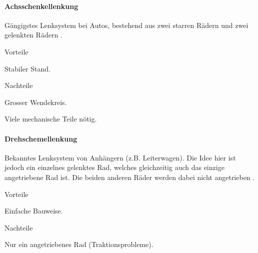 \documentclass[../main.tex]{subfiles}
\begin{document}
\paragraph{Achsschenkellenkung} \label{recherche-achsschenkellenkung}

Gängigstes Lenksystem bei Autos, bestehend aus zwei starren Rädern und zwei gelenkten Rädern \cite{achsschenkel}.

\begin{minipage}[t]{0.48\textwidth}
    \begin{items}
      \item [Vorteile]
      \item Stabiler Stand.
 \end{items}
\end{minipage}
\hfill
\begin{minipage}[t]{0.48\textwidth}
    \begin{items}
      \item [Nachteile]
      \item Grosser Wendekreis.
      \item Viele mechanische Teile nötig.
    \end{items}
\end{minipage}

\paragraph{Drehschemellenkung} \label{recherche-drehschemellenkung}

Bekanntes Lenksystem von Anhängern (z.B. Leiterwagen). Die Idee hier ist jedoch ein einzelnes gelenktes Rad, welches gleichzeitig auch das einzige angetriebene Rad ist. Die beiden anderen Räder werden dabei nicht angetrieben \cite{lenkungsarten}.

\begin{minipage}[t]{0.48\textwidth}
    \begin{items}
      \item [Vorteile]
      \item Einfache Bauweise.
 \end{items}
\end{minipage}
\hfill
\begin{minipage}[t]{0.48\textwidth}
    \begin{items}
      \item [Nachteile]
      \item Nur ein angetriebenes Rad (Traktionsprobleme).
    \end{items}
\end{minipage}
\end{document}

